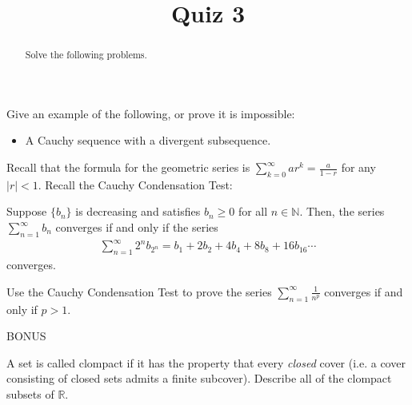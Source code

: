 \documentclass{ximera}
\begin{document}
    \title{Quiz 3}
    \begin{abstract} Solve the following problems. \end{abstract}
    \maketitle
\begin{exercise}
    Give an example of the following, or prove it is impossible:
    \begin{itemize}
        \item A Cauchy sequence with a divergent subsequence.
    \end{itemize}
\end{exercise} 
\newpage
Recall that the formula for the geometric series is $\sum\limits_{k=0}^\infty ar^k= \frac{a}{1-r}$ for any $|r| < 1$.  Recall the Cauchy Condensation Test:
\begin{theorem}
    Suppose $\{b_n\}$ is decreasing and satisfies $b_n \geq 0$ for all $n \in \mathbb{N}$.  Then, the series $\sum\limits_{n=1}^\infty b_n$ converges if and only if the series 
    \begin{align*}
        \sum\limits_{n=1}^\infty 2^n b_{2^n} = b_1 + 2b_2 + 4b_4 + 8b_8 + 16b_{16}\cdots
    \end{align*}
    converges.
\end{theorem}
\begin{exercise}
    Use the Cauchy Condensation Test to prove the series $\sum\limits_{n=1}^\infty \frac{1}{n^p}$ converges if and only if $p >1$.
\end{exercise}
\newpage
BONUS

\begin{exercise}
  A set is called clompact if it has the property that every \textit{closed} cover (i.e. a cover consisting of closed sets admits a finite subcover).  Describe all of the clompact subsets of $\mathbb{R}$. 
\end{exercise}
\end{document}
